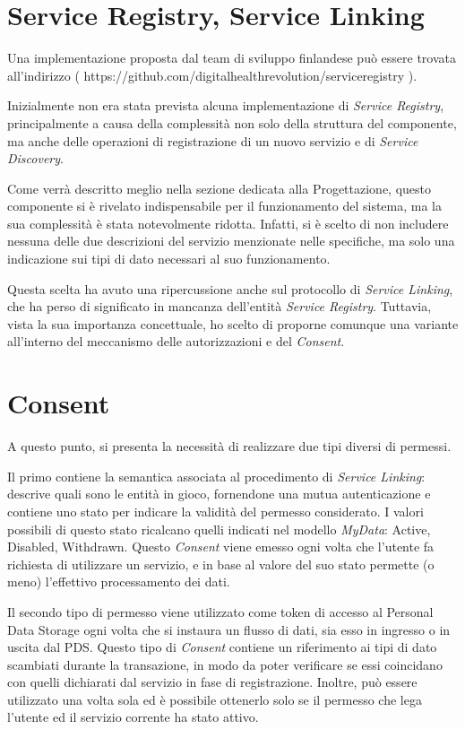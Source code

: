 \section{Service Registry, Service Linking}
Una implementazione proposta dal team di sviluppo finlandese pu\`o essere trovata all’indirizzo ( https://github.com/digitalhealthrevolution/serviceregistry ). 

Inizialmente non era stata prevista alcuna implementazione di \textit{Service Registry}, principalmente a causa della complessit\`a non solo della struttura del componente, ma anche delle operazioni di registrazione di un nuovo servizio e di \textit{Service Discovery}.

Come verr\`a descritto meglio nella sezione dedicata alla Progettazione, questo componente si \`e rivelato indispensabile per il funzionamento del sistema, ma la sua complessit\`a \`e stata notevolmente ridotta. Infatti, si \`e scelto di non includere nessuna delle due descrizioni del servizio menzionate nelle specifiche, ma solo una indicazione sui tipi di dato necessari al suo funzionamento.

Questa scelta ha avuto una ripercussione anche sul protocollo di \textit{Service Linking}, che ha perso di significato in mancanza dell’entit\`a \textit{Service Registry}. Tuttavia, vista la sua importanza concettuale, ho scelto di proporne comunque una variante all’interno del meccanismo delle autorizzazioni e del \textit{Consent}.

\section{Consent}
\label{sec:A-Consent}
A questo punto, si presenta la necessit\`a di realizzare due tipi diversi di permessi.

Il primo contiene la semantica associata al procedimento di \textit{Service Linking}: descrive quali sono le entit\`a in gioco, fornendone una mutua autenticazione e contiene uno stato per indicare la validit\`a del permesso considerato. I valori possibili di questo stato ricalcano quelli indicati nel modello \textit{MyData}: Active, Disabled, Withdrawn. Questo \textit{Consent} viene emesso ogni volta che l’utente fa richiesta di utilizzare un servizio, e in base al valore del suo stato permette (o meno) l’effettivo processamento dei dati.

Il secondo tipo di permesso viene utilizzato come token di accesso al Personal Data Storage ogni volta che si instaura un flusso di dati, sia esso in ingresso o in uscita dal PDS. Questo tipo di \textit{Consent} contiene un riferimento ai tipi di dato scambiati durante la transazione, in modo da poter verificare se essi coincidano con quelli dichiarati dal servizio in fase di registrazione. Inoltre, pu\`o essere utilizzato una volta sola ed \`e possibile ottenerlo solo se il permesso che lega l’utente ed il servizio corrente ha stato attivo.

